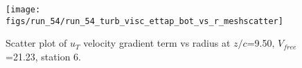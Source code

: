 \begin{figure}[H]
\centering
\texttt{[image: figs/run\_54/run\_54\_turb\_visc\_ettap\_bot\_vs\_r\_meshscatter]}
\caption{Scatter plot of $
u_T$ velocity gradient term vs radius at $z/c$=9.50, $V_{free}$=21.23, station 6.}
\end{figure}


